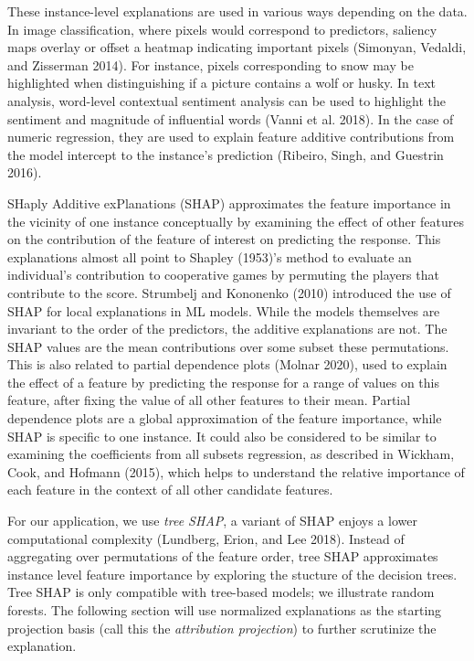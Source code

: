 \documentclass[
]{article}
\begin{document}
These instance-level explanations are used in various ways depending on the data. In image classification, where pixels would correspond to predictors, saliency maps overlay or offset a heatmap indicating important pixels (Simonyan, Vedaldi, and Zisserman 2014). For instance, pixels corresponding to snow may be highlighted when distinguishing if a picture contains a wolf or husky. In text analysis, word-level contextual sentiment analysis can be used to highlight the sentiment and magnitude of influential words (Vanni et al. 2018). In the case of numeric regression, they are used to explain feature additive contributions from the model intercept to the instance's prediction (Ribeiro, Singh, and Guestrin 2016).

SHaply Additive exPlanations (SHAP) approximates the feature importance in the vicinity of one instance conceptually by examining the effect of other features on the contribution of the feature of interest on predicting the response. This explanations almost all point to Shapley (1953)'s method to evaluate an individual's contribution to cooperative games by permuting the players that contribute to the score. Strumbelj and Kononenko (2010) introduced the use of SHAP for local explanations in ML models. While the models themselves are invariant to the order of the predictors, the additive explanations are not. The SHAP values are the mean contributions over some subset these permutations. This is also related to partial dependence plots (Molnar 2020), used to explain the effect of a feature by predicting the response for a range of values on this feature, after fixing the value of all other features to their mean. Partial dependence plots are a global approximation of the feature importance, while SHAP is specific to one instance. It could also be considered to be similar to examining the coefficients from all subsets regression, as described in Wickham, Cook, and Hofmann (2015), which helps to understand the relative importance of each feature in the context of all other candidate features.

For our application, we use \emph{tree SHAP}, a variant of SHAP enjoys a lower computational complexity (Lundberg, Erion, and Lee 2018). Instead of aggregating over permutations of the feature order, tree SHAP approximates instance level feature importance by exploring the stucture of the decision trees. Tree SHAP is only compatible with tree-based models; we illustrate random forests. The following section will use normalized explanations as the starting projection basis (call this the \emph{attribution projection}) to further scrutinize the explanation.
\end{document}
